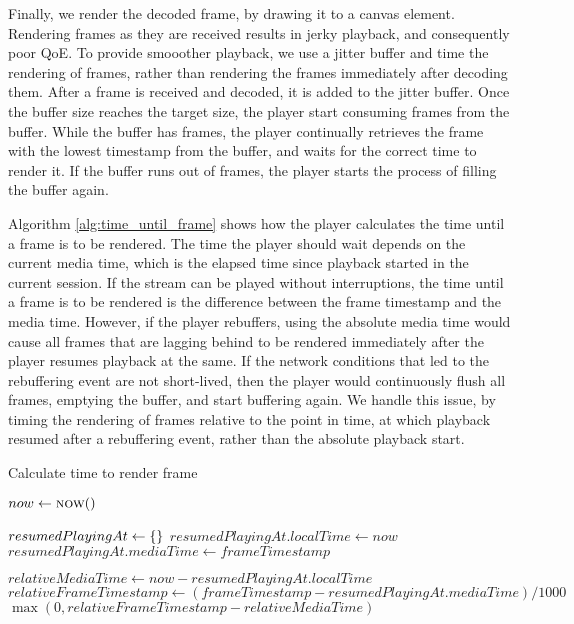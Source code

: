 Finally, we render the decoded frame, by drawing it to a canvas element. Rendering frames as they are received results in jerky playback, and consequently poor \ac{QoE}. To provide smooother playback, we use a jitter buffer and time the rendering of frames, rather than rendering the frames immediately after decoding them. After a frame is received and decoded, it is added to the jitter buffer. Once the buffer size reaches the target size, the player start consuming frames from the buffer. While the buffer has frames, the player continually retrieves the frame with the lowest timestamp from the buffer, and waits for the correct time to render it. If the buffer runs out of frames, the player starts the process of filling the buffer again.

Algorithm \ref{alg:time_until_frame} shows how the player calculates the time until a frame is to be rendered. The time the player should wait depends on the current media time, which is the elapsed time since playback started in the current session. If the stream can be played without interruptions, the time until a frame is to be rendered is the difference between the frame timestamp and the media time. However, if the player rebuffers, using the absolute media time would cause all frames that are lagging behind to be rendered immediately after the player resumes playback at the same. If the network conditions that led to the rebuffering event are not short-lived, then the player would continuously flush all frames, emptying the buffer, and start buffering again. We handle this issue, by timing the rendering of frames relative to the point in time, at which playback resumed after a rebuffering event, rather than the absolute playback start.  %

\begin{algorithm}
\caption{Calculate time to render frame}\label{alg:time_until_frame}
\begin{algorithmic}
    \State $now \gets \Call{now}{\null}$
    \item[]
        \State $resumedPlayingAt \gets \textnormal{\{\}}$
        \State $resumedPlayingAt.localTime \gets now$
        \State $resumedPlayingAt.mediaTime \gets frameTimestamp$
    \EndIf
    \item[]
    \State $relativeMediaTime \gets now - resumedPlayingAt.localTime$
    \State $relativeFrameTimestamp \gets (frameTimestamp - resumedPlayingAt.mediaTime) / 1000$
    \State \Return $\max(0, relativeFrameTimestamp - relativeMediaTime)$
\EndFunction
\end{algorithmic}
\end{algorithm}


